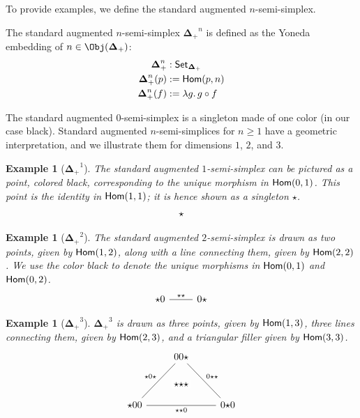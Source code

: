 \documentclass{msc}
\newcommand{\DeltaPlus}{\ensuremath{\boldsymbol{\Delta}_+}}
\newtheorem{example}[therm]{Example}
\newcommand{\kstar}{{\star}}
\begin{document}
To provide examples, we define the standard augmented $n$-semi-simplex.

\begin{definition}[$\DeltaPlus^n$]
  The standard augmented $n$-semi-simplex $\DeltaPlus^n$ is defined as the Yoneda embedding of $n \in \Obj(\DeltaPlus)$:
  \begin{align*}
    \DeltaPlus^n    & : \Set_{\DeltaPlus}        \\
    \DeltaPlus^n(p) & := \Hom(p, n)              \\
    \DeltaPlus^n(f) & := \lambda g .\, g \circ f
  \end{align*}
\end{definition}

The standard augmented $0$-semi-simplex is a singleton made of one color (in our case black). Standard augmented $n$-semi-simplices for $n\geq 1$ have a geometric interpretation, and we illustrate them for dimensions $1$, $2$, and $3$.

\begin{example}[$\DeltaPlus^1$]
  The standard augmented $1$-semi-simplex can be pictured as a point, colored black, corresponding to the unique morphism in $\mathsf{Hom}(0, 1)$. This point is the identity in $\mathsf{Hom}(1, 1)$; it is hence shown as a singleton $\kstar$.
  \begin{equation*}
    \begin{tikzcd}
      \kstar
    \end{tikzcd}
  \end{equation*}
\end{example}

\begin{example}[$\DeltaPlus^2$]
  The standard augmented $2$-semi-simplex is drawn as two points, given by $\mathsf{Hom}(1, 2)$, along with a line connecting them, given by $\mathsf{Hom}(2, 2)$. We use the color black to denote the unique morphisms in $\mathsf{Hom}(0, 1)$ and $\mathsf{Hom}(0, 2)$.
  \begin{equation*}
    \begin{tikzcd}
      \kstar0 \arrow[r, dash, "\kstar\kstar"] & 0\kstar
    \end{tikzcd}
  \end{equation*}
\end{example}

\begin{example}[$\DeltaPlus^3$]
  $\DeltaPlus^3$ is drawn as three points, given by $\mathsf{Hom}(1, 3)$, three lines connecting them, given by $\mathsf{Hom}(2, 3)$, and a triangular filler given by $\mathsf{Hom}(3, 3)$.
  \begin{equation*}
    \begin{tikzcd}
      & |[alias=F]|00\kstar \arrow[ddr, dash, "0\kstar\kstar"] & \\\\
      \kstar00 \arrow[rr, dash, "\kstar\kstar0"{name=T, below}]\arrow[uur, dash, "\kstar0\kstar"] && 0\kstar0 \\
      \arrow[rightarrow, from=F, to=T, phantom, "\kstar\kstar\kstar" description]
    \end{tikzcd}
  \end{equation*}
\end{example}
\end{document}

